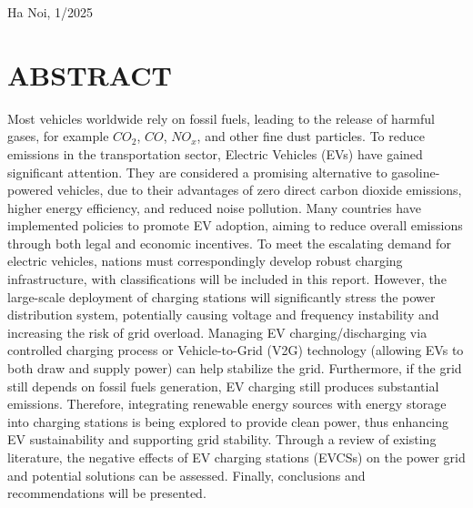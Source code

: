 \documentclass{thesis}
\begin{document}
\begin{center}
    \vspace{48pt}
    \fontsize{14pt}{0pt}\selectfont{} Ha Noi, 1/2025
\end{center}

            \thispagestyle{empty}
                \cleardoublepage

\thispagestyle{empty}
    \clearpage
        \thispagestyle{empty}
        
\section*{ABSTRACT}
    \thispagestyle{empty}
Most vehicles worldwide rely on fossil fuels, leading to the release of harmful gases, for example $CO_2$, $CO$, $NO_x$, and other fine dust particles. To reduce emissions in the transportation sector, Electric Vehicles (EVs) have gained significant attention. They are considered a promising alternative to gasoline-powered vehicles, due to their advantages of zero direct carbon dioxide emissions, higher energy efficiency, and reduced noise pollution. Many countries have implemented policies to promote EV adoption, aiming to reduce overall emissions through both legal and economic incentives. To meet the escalating demand for electric vehicles, nations must correspondingly develop robust charging infrastructure, with classifications will be included in this report. However, the large-scale deployment of charging stations will significantly stress the power distribution system, potentially causing voltage and frequency instability and increasing the risk of grid overload. Managing EV charging/discharging via controlled charging process or Vehicle-to-Grid (V2G) technology (allowing EVs to both draw and supply power) can help stabilize the grid. Furthermore, if the grid still depends on fossil fuels generation, EV charging still produces substantial emissions. Therefore, integrating renewable energy sources with energy storage into charging stations is being explored to provide clean power, thus enhancing EV sustainability and supporting grid stability. Through a review of existing literature, the negative effects of EV charging stations (EVCSs) on the power grid and potential solutions can be assessed. Finally, conclusions and recommendations will be presented.
\thispagestyle{empty}
    \clearpage

\tableofcontents 
    \thispagestyle{empty}
        \newpage
            \thispagestyle{empty}
\end{document}
